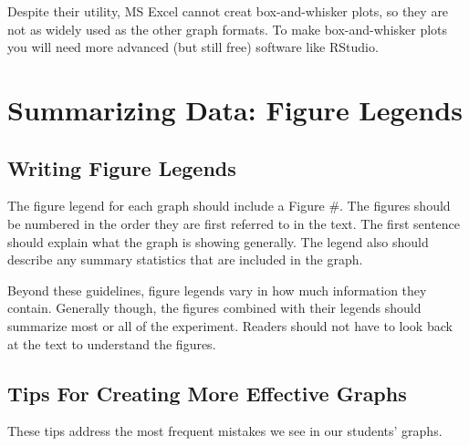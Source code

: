\documentclass[
]{book}
\begin{document}
Despite their utility, MS Excel cannot creat box-and-whisker plots, so they are not as widely used as the other graph formats. To make box-and-whisker plots you will need more advanced (but still free) software like RStudio.

\hypertarget{chartstwo426}{%
\chapter{Summarizing Data: Figure Legends}\label{chartstwo426}}

\hypertarget{writing-figure-legends}{%
\section{Writing Figure Legends}\label{writing-figure-legends}}

The figure legend for each graph should include a Figure \#. The figures should be numbered in the order they are first referred to in the text. The first sentence should explain what the graph is showing generally. The legend also should describe any summary statistics that are included in the graph.

Beyond these guidelines, figure legends vary in how much information they contain. Generally though, the figures combined with their legends should summarize most or all of the experiment. Readers should not have to look back at the text to understand the figures.

\hypertarget{tips-for-creating-more-effective-graphs}{%
\section{Tips For Creating More Effective Graphs}\label{tips-for-creating-more-effective-graphs}}

These tips address the most frequent mistakes we see in our students' graphs.
\end{document}
